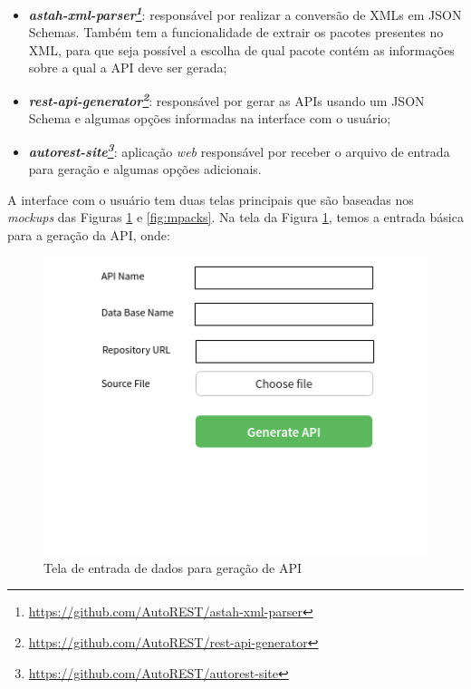 \begin{itemize}
    \item \textit{\textbf{astah-xml-parser\footnote{\url{https://github.com/AutoREST/astah-xml-parser}}}}: responsável por realizar a conversão de XMLs em JSON Schemas. Também tem a funcionalidade de extrair os pacotes presentes no XML, para que seja possível a escolha de qual pacote contém as informações sobre a qual a API deve ser gerada;
    \item \textit{\textbf{rest-api-generator\footnote{\url{https://github.com/AutoREST/rest-api-generator}}}}: responsável por gerar as APIs usando um JSON Schema e algumas opções informadas na interface com o usuário;
    \item \textit{\textbf{autorest-site\footnote{\url{https://github.com/AutoREST/autorest-site}}}}: aplicação \textit{web} responsável por receber o arquivo de entrada para geração e algumas opções adicionais.
\end{itemize}

A interface com o usuário tem duas telas principais que são baseadas nos \textit{mockups} das Figuras \ref{fig:mindex} e \ref{fig:mpacks}. Na tela da Figura \ref{fig:mindex}, temos a entrada básica para a geração da API, onde:

\begin{figure}
    \begin{center}
        \includegraphics[scale=0.7]{imagens/Mockup_index.png}
    \end{center}
	\caption{\label{fig:mindex}Tela de entrada de dados para geração de API}
\end{figure}

